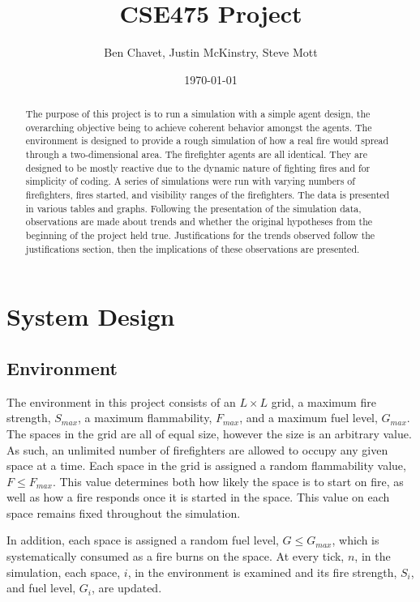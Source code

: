 \documentclass{article}
\title{CSE475 Project}
\author{Ben Chavet, Justin McKinstry, Steve Mott}
\date{\today}
\begin{document}
  \maketitle

  \begin{abstract}
    The purpose of this project is to run a simulation with a simple agent
    design, the overarching objective being to achieve coherent behavior
    amongst the agents. The environment is designed to provide a rough
    simulation of how a real fire would spread through a two-dimensional
    area. The firefighter agents are all identical. They are designed to be
    mostly reactive due to the dynamic nature of fighting fires and for
    simplicity of coding. A series of simulations were run with varying numbers
    of firefighters, fires started, and visibility ranges of the firefighters.
    The data is presented in various tables and graphs. Following the
    presentation of the simulation data, observations are made about trends
    and whether the original hypotheses from the beginning of the
    project held true. Justifications for the trends observed follow the
    justifications section, then the implications of these observations are
    presented.
  \end{abstract}

\section{System Design}

  \subsection{Environment}

  The environment in this project consists of an $L \times L$ grid, a maximum
  fire strength, $S_{max}$, a maximum flammability, $F_{max}$, and a maximum
  fuel level, $G_{max}$.  The spaces in the grid are all of equal size, however
  the size is an arbitrary value.  As such, an unlimited number of firefighters are allowed
  to occupy any given space at a time.  Each space in the grid is assigned a random
  flammability value, $F \leq F_{max}$.  This value determines both how
  likely the space is to start on fire, as well as how a fire responds once
  it is started in the space.  This value on each space remains fixed
  throughout the simulation.

  In addition, each space is assigned a random fuel level, $G \leq G_{max}$,
  which is systematically consumed as a fire burns on the space.  At every
  tick, $n$, in the simulation, each space, $i$, in the environment is examined and
  its fire strength, $S_i$, and fuel level, $G_i$, are updated.
\end{document}
